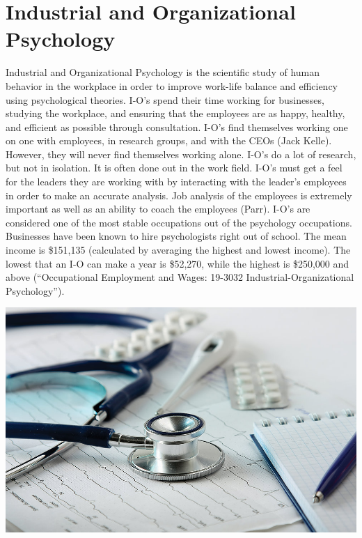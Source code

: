\chapter{Industrial and Organizational Psychology}
\begin{multicols}{2}

Industrial and Organizational Psychology is the scientific study of human behavior in the workplace in order to improve work-life balance and efficiency using psychological theories. I-O’s spend their time working for businesses, studying the workplace, and ensuring that the employees are as happy, healthy, and efficient as possible through consultation. I-O’s find themselves working one on one with employees, in research groups, and with the CEOs (Jack Kelle). However, they will never find themselves working alone. I-O’s do a lot of research, but not in isolation. It is often done out in the work field. I-O’s must get a feel for the leaders they are working with by interacting with the leader's employees in order to make an accurate analysis. Job analysis of the employees is extremely important as well as an ability to coach the employees (Parr). I-O’s are considered one of the most stable occupations out of the psychology occupations. Businesses have been known to hire psychologists right out of school. The mean income is \$151,135 (calculated by averaging the highest and lowest income). The lowest that an I-O can make a year is \$52,270, while the highest is \$250,000 and above (“Occupational Employment and Wages: 19-3032 Industrial-Organizational Psychology”). 

\begin{Figure}
 \centering
 \includegraphics[width=\linewidth]{images/Psychology}
 \label{fig:Doctor Desk}
\end{Figure}

\end{multicols}

